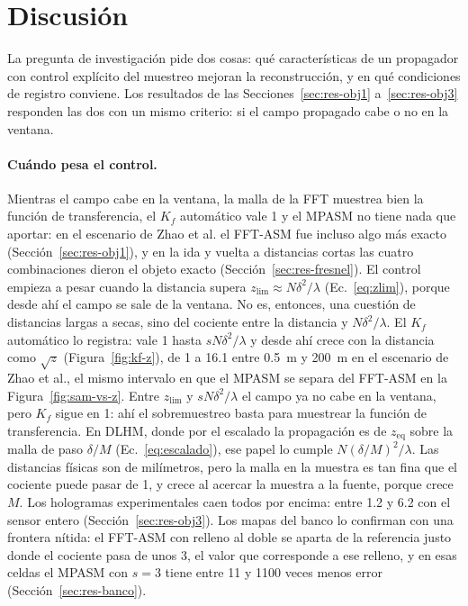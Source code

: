 \section{Discusión}
\label{sec:discusion}

La pregunta de investigación pide dos cosas: qué características de un
propagador con control explícito del muestreo mejoran la reconstrucción, y en
qué condiciones de registro conviene. Los resultados de las
Secciones~\ref{sec:res-obj1} a~\ref{sec:res-obj3} responden las dos con un
mismo criterio: si el campo propagado cabe o no en la ventana.

\paragraph{Cuándo pesa el control.} Mientras el campo cabe en la ventana, la
malla de la FFT muestrea bien la función de transferencia, el $K_f$
automático vale 1 y el MPASM no tiene nada que aportar: en el escenario de Zhao
et al. el FFT-ASM fue incluso algo más exacto (Sección~\ref{sec:res-obj1}),
y en la ida y vuelta a distancias cortas las cuatro combinaciones dieron el
objeto exacto (Sección~\ref{sec:res-fresnel}). El control empieza a pesar
cuando la distancia supera $z_\mathrm{lim} \approx N\delta^2/\lambda$
(Ec.~\eqref{eq:zlim}), porque desde ahí el campo se sale de la ventana. No es,
entonces, una cuestión de distancias largas a secas, sino del cociente entre
la distancia y $N\delta^2/\lambda$. El $K_f$ automático lo registra: vale 1
hasta $sN\delta^2/\lambda$ y desde ahí crece con la distancia como
$\sqrt{z}$ (Figura~\ref{fig:kf-z}), de 1 a 16.1 entre \SI{0.5}{m} y
\SI{200}{m} en el escenario de Zhao et al., el mismo intervalo en que el MPASM
se separa del FFT-ASM en la Figura~\ref{fig:sam-vs-z}. Entre
$z_\mathrm{lim}$ y $sN\delta^2/\lambda$ el campo ya no cabe en la ventana,
pero $K_f$ sigue en 1: ahí el sobremuestreo basta para muestrear la función de
transferencia. En DLHM, donde por el escalado la
propagación es de $z_\mathrm{eq}$ sobre la malla de paso $\delta/M$
(Ec.~\eqref{eq:escalado}), ese papel lo cumple $N(\delta/M)^2/\lambda$. Las
distancias físicas son de milímetros, pero la malla en la muestra es tan fina
que el cociente puede pasar de 1, y crece al acercar la muestra a la fuente,
porque crece $M$. Los hologramas experimentales caen todos por encima: entre
1.2 y 6.2 con el sensor entero (Sección~\ref{sec:res-obj3}). Los mapas del
banco lo confirman con una frontera nítida: el FFT-ASM con relleno al doble se
aparta de la referencia justo donde el cociente pasa de unos 3, el valor que
corresponde a ese relleno, y en esas celdas el MPASM con $s = 3$ tiene
entre 11 y 1100 veces menos error (Sección~\ref{sec:res-banco}).

